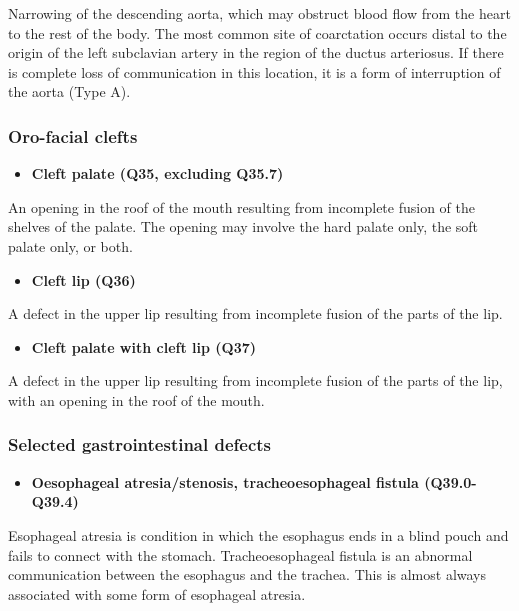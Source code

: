 \documentclass[
]{krantz}
\providecommand{\tightlist}{%
  \setlength{\itemsep}{0pt}\setlength{\parskip}{0pt}}
\begin{document}
Narrowing of the descending aorta, which may obstruct blood flow from the heart to the rest of the body. The most common site of coarctation occurs distal to the origin of the left subclavian artery in the region of the ductus arteriosus. If there is complete loss of communication in this location, it is a form of interruption of the aorta (Type A).

\hypertarget{section2115}{%
\subsubsection{Oro-facial clefts}\label{section2115}}

\begin{itemize}
\tightlist
\item
  \textbf{Cleft palate (Q35, excluding Q35.7)}
\end{itemize}

An opening in the roof of the mouth resulting from incomplete fusion of the shelves of the palate. The opening may involve the hard palate only, the soft palate only, or both.

\begin{itemize}
\tightlist
\item
  \textbf{Cleft lip (Q36)}
\end{itemize}

A defect in the upper lip resulting from incomplete fusion of the parts of the lip.

\begin{itemize}
\tightlist
\item
  \textbf{Cleft palate with cleft lip (Q37)}
\end{itemize}

A defect in the upper lip resulting from incomplete fusion of the parts of the lip, with an opening in the roof of the mouth.

\hypertarget{section2116}{%
\subsubsection{Selected gastrointestinal defects}\label{section2116}}

\begin{itemize}
\tightlist
\item
  \textbf{Oesophageal atresia/stenosis, tracheoesophageal fistula (Q39.0-Q39.4)}
\end{itemize}

Esophageal atresia is condition in which the esophagus ends in a blind pouch and fails to connect with the stomach. Tracheoesophageal fistula is an abnormal communication between the esophagus and the trachea. This is almost always associated with some form of esophageal atresia.
\end{document}
